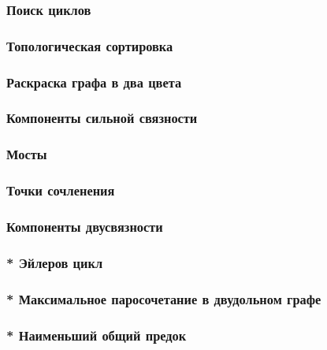 \documentclass[a4paper,12pt]{article}
\begin{document}
      \subsubsection{Поиск циклов}
      \subsubsection{Топологическая сортировка}
      \subsubsection{Раскраска графа в два цвета}
      \subsubsection{Компоненты сильной связности}
      \subsubsection{Мосты}
      \subsubsection{Точки сочленения}
      \subsubsection{Компоненты двусвязности}
      \subsubsection{* Эйлеров цикл}
      \subsubsection{* Максимальное паросочетание в двудольном графе}
      \subsubsection{* Наименьший общий предок}
\end{document}

